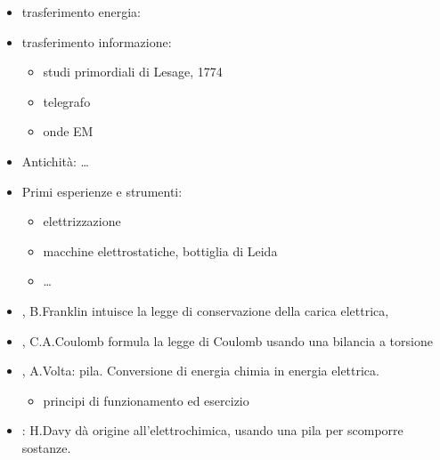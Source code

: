 \documentclass[letterpaper,10pt,italian]{jupyterBook}
\begin{document}
\sphinxAtStartPar
{}
\begin{itemize}
\item {} 
\sphinxAtStartPar
trasferimento energia:

\item {} 
\sphinxAtStartPar
trasferimento informazione:
\begin{itemize}
\item {} 
\sphinxAtStartPar
studi primordiali di Lesage, 1774

\item {} 
\sphinxAtStartPar
telegrafo

\item {} 
\sphinxAtStartPar
onde EM

\end{itemize}

\item {} 
\sphinxAtStartPar
Antichità: …

\item {} 
\sphinxAtStartPar
Primi esperienze e strumenti:
\begin{itemize}
\item {} 
\sphinxAtStartPar
elettrizzazione

\item {} 
\sphinxAtStartPar
macchine elettrostatiche, bottiglia di Leida

\item {} 
\sphinxAtStartPar
…

\end{itemize}

\item {} 
, B.Franklin intuisce la legge di conservazione della carica elettrica, 

\item {} 
, C.A.Coulomb formula la legge di Coulomb usando una bilancia a torsione

\item {} 
, A.Volta: pila. Conversione di energia chimia in energia elettrica.
\begin{itemize}
\item {} 
\sphinxAtStartPar
{} principi di funzionamento ed esercizio

\end{itemize}

\item {} 
: H.Davy dà origine all’elettrochimica, usando una pila per scomporre sostanze.  


\end{itemize}
\end{document}
